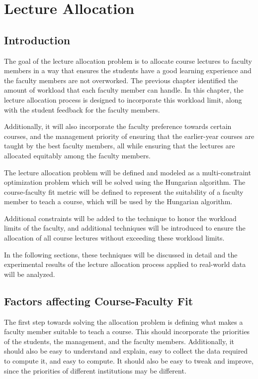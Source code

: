 
\chapter{Lecture Allocation}

\section{Introduction}

The goal of the lecture allocation problem is to allocate course lectures to faculty members in a way that ensures the students have a good learning experience and the faculty members are not overworked. The previous chapter identified the amount of workload that each faculty member can handle. In this chapter, the lecture allocation process is designed to incorporate this workload limit, along with the student feedback for the faculty members.

Additionally, it will also incorporate the faculty preference towards certain courses, and the management priority of ensuring that the earlier-year courses are taught by the best faculty members, all while ensuring that the lectures are allocated equitably among the faculty members.

The lecture allocation problem will be defined and modeled as a multi-constraint optimization problem which will be solved using the Hungarian algorithm. The course-faculty fit metric will be defined to represent the suitability of a faculty member to teach a course, which will be used by the Hungarian algorithm.

Additional constraints will be added to the technique to honor the workload limits of the faculty, and additional techniques will be introduced to ensure the allocation of all course lectures without exceeding these workload limits.

In the following sections, these techniques will be discussed in detail and the experimental results of the lecture allocation process applied to real-world data will be analyzed.

\section{Factors affecting Course-Faculty Fit}

The first step towards solving the allocation problem is defining what makes a faculty member suitable to teach a course. This should incorporate the priorities of the students, the management, and the faculty members. Additionally, it should also be easy to understand and explain, easy to collect the data required to compute it, and easy to compute. It should also be easy to tweak and improve, since the priorities of different institutions may be different.

